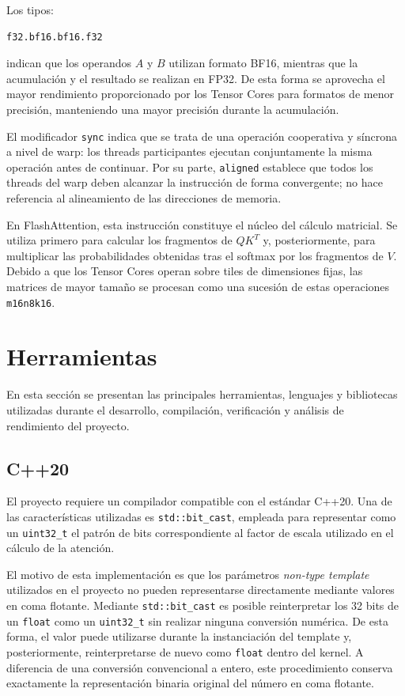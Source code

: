 Los tipos:

\begin{verbatim}
f32.bf16.bf16.f32
\end{verbatim}

indican que los operandos \(A\) y \(B\) utilizan formato BF16, mientras que la acumulación y el resultado se realizan en FP32. De esta forma se aprovecha el mayor rendimiento proporcionado por los Tensor Cores para formatos de menor precisión, manteniendo una mayor precisión durante la acumulación.

El modificador \texttt{sync} indica que se trata de una operación cooperativa y síncrona a nivel de warp: los threads participantes ejecutan conjuntamente la misma operación antes de continuar. Por su parte, \texttt{aligned} establece que todos los threads del warp deben alcanzar la instrucción de forma convergente; no hace referencia al alineamiento de las direcciones de memoria.

En FlashAttention, esta instrucción constituye el núcleo del cálculo matricial. Se utiliza primero para calcular los fragmentos de \(QK^T\) y, posteriormente, para multiplicar las probabilidades obtenidas tras el softmax por los fragmentos de \(V\). Debido a que los Tensor Cores operan sobre tiles de dimensiones fijas, las matrices de mayor tamaño se procesan como una sucesión de estas operaciones \texttt{m16n8k16}.

\section{Herramientas}

En esta sección se presentan las principales herramientas, lenguajes y bibliotecas utilizadas durante el desarrollo, compilación, verificación y análisis de rendimiento del proyecto.

\subsection{C++20}

El proyecto requiere un compilador compatible con el estándar C++20. Una de las características utilizadas es \texttt{std::bit\_cast}, empleada para representar como un \texttt{uint32\_t} el patrón de bits correspondiente al factor de escala utilizado en el cálculo de la atención.

El motivo de esta implementación es que los parámetros \textit{non-type template} utilizados en el proyecto no pueden representarse directamente mediante valores en coma flotante. Mediante \texttt{std::bit\_cast} es posible reinterpretar los 32 bits de un \texttt{float} como un \texttt{uint32\_t} sin realizar ninguna conversión numérica. De esta forma, el valor puede utilizarse durante la instanciación del template y, posteriormente, reinterpretarse de nuevo como \texttt{float} dentro del kernel. A diferencia de una conversión convencional a entero, este procedimiento conserva exactamente la representación binaria original del número en coma flotante.

